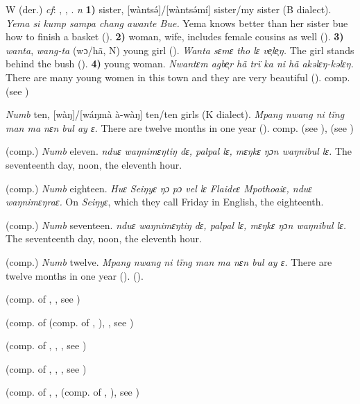 \begin{letter}{W}
 (der.) \textit{cf}: , , . \textit{n} \textbf{1)} sister, [wàntsə́]/[wàntsə́mí] sister/my sister (B dialect). \textit{Yema si kump sampa chang awante Bue.} Yema knows better than her sister bue how to finish a basket (\citealt{Pichl1967}). \textbf{2)} woman, wife, includes female cousins as well (\citealt{Hall1938}). \textbf{3)} \textit{wanta}, \textit{wang-ta} (wɔ/hã, N) young girl (\citealt{Pichl1967}). \textit{Wanta sɛmɛ tho lɛ ve̹le̹ŋ.} The girl stands behind the bush (\citealt{Pichl1967}). \textbf{4)} young woman. \textit{Nwantɛm agbe̹r hã trï ka ni hã akəlɛŋ-kəlɛŋ.} There are many young women in this town and they are very beautiful (\citealt{Pichl1967}). comp.  (see ) 

 \textit{Numb} ten, [wàŋ]/[wáŋmà à-wàŋ] ten/ten girls (K dialect). \textit{Mpang nwang ni tïng man ma nɛn bul ay ɛ.} There are twelve months in one year (\citealt{Pichl1967}). comp.  (see ),  (see ) 

 (comp.) \textit{Numb} eleven. \textit{nduɛ waŋnimɛŋtiŋ dɛ, palpal lɛ, mɛŋkɛ ŋɔn waŋnibul lɛ.} The seventeenth day, noon, the eleventh hour.

 (comp.) \textit{Numb} eighteen. \textit{Huɛ Seiŋyɛ ŋɔ pɔ vel lɛ Flaideɛ Mpothoaiɛ, nduɛ waŋnimɛŋraɛ.} On \textit{Seiŋyɛ}, which they call Friday in English, the eighteenth.

 (comp.) \textit{Numb} seventeen. \textit{nduɛ waŋnimɛŋtiŋ dɛ, palpal lɛ, mɛŋkɛ ŋɔn waŋnibul lɛ.} The seventeenth day, noon, the eleventh hour.

 (comp.) \textit{Numb} twelve. \textit{Mpang nwang ni tïng man ma nɛn bul ay ɛ.} There are twelve months in one year (\citealt{Pichl1967}). (\citealt{Pichl1967}).

 (comp. of , , see ) 

 (comp. of  (comp. of , ), , see ) 

 (comp. of , , , see ) 

 (comp. of , , , see ) 

 (comp. of , ,  (comp. of , ), see ) 


\end{letter}
